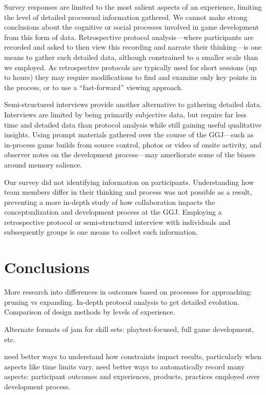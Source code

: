 \documentclass{sig-alternate}
\begin{document}
Survey responses are limited to the most salient aspects of an experience, limiting the level of detailed processual information gathered. We cannot make strong conclusions about the cognitive or social processes involved in game development from this form of data. Retrospective protocol analysis---where participants are recorded and asked to then view this recording and narrate their thinking---is one means to gather such detailed data, although constrained to a smaller scale than we employed. As retrospective protocols are typically used for short sessions (up to hours) they may require modifications to find and examine only key points in the process, or to use a ``fast-forward'' viewing approach. 

Semi-structured interviews provide another alternative to gathering detailed data. Interviews are limited by being primarily subjective data, but require far less time and detailed data than protocol analysis while still gaining useful qualitative insights. Using prompt materials gathered over the course of the GGJ---such as in-process game builds from source control, photos or video of onsite activity, and observer notes on the development process---may amerliorate some of the biases around memory salience.

Our survey did not identifying information on participants. Understanding how team members differ in their thinking and process was not possible as a result, preventing a more in-depth study of how collaboration impacts the conceptualization and development process at the GGJ. Employing a retrospective protocol or semi-structured interview with individuals and subsequently groups is one means to collect such information.


\section{Conclusions}
More research into differences in outcomes based on processes for approaching: pruning vs expanding. In-depth protocol analysis to get detailed evolution. Comparison of design methods by levels of experience.

Alternate formats of jam for skill sets: playtest-focused, full game development, etc.

need better ways to understand how constraints impact results, particularly when aspects like time limits vary. need better ways to automatically record many aspects: participant outcomes and experiences, products, practices employed over development process.
\end{document}
